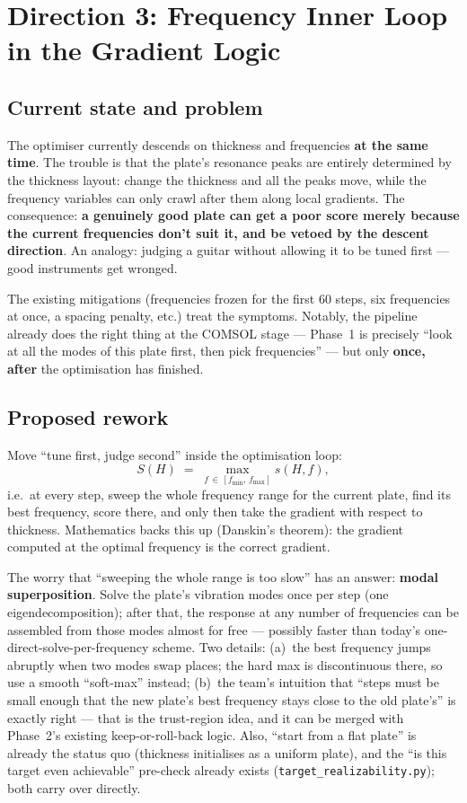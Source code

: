 \documentclass[11pt,a4paper]{article}
\newcommand{\code}[1]{\texttt{#1}}
\begin{document}
\section{Direction 3: Frequency Inner Loop in the Gradient Logic}

\subsection{Current state and problem}

The optimiser currently descends on thickness and frequencies \textbf{at the same time}. The trouble is that the plate's resonance peaks are entirely determined by the thickness layout: change the thickness and all the peaks move, while the frequency variables can only crawl after them along local gradients. The consequence: \textbf{a genuinely good plate can get a poor score merely because the current frequencies don't suit it, and be vetoed by the descent direction}. An analogy: judging a guitar without allowing it to be tuned first --- good instruments get wronged.

The existing mitigations (frequencies frozen for the first 60 steps, six frequencies at once, a spacing penalty, etc.) treat the symptoms. Notably, the pipeline already does the right thing at the COMSOL stage --- Phase~1 is precisely ``look at all the modes of this plate first, then pick frequencies'' --- but only \textbf{once, after} the optimisation has finished.

\subsection{Proposed rework}

Move ``tune first, judge second'' inside the optimisation loop:
\begin{equation}
S(H) \;=\; \max_{f\,\in\,[f_{\min},\,f_{\max}]} s(H, f),
\end{equation}
i.e.\ at every step, sweep the whole frequency range for the current plate, find its best frequency, score there, and only then take the gradient with respect to thickness. Mathematics backs this up (Danskin's theorem): the gradient computed at the optimal frequency is the correct gradient.

The worry that ``sweeping the whole range is too slow'' has an answer: \textbf{modal superposition}. Solve the plate's vibration modes once per step (one eigendecomposition); after that, the response at any number of frequencies can be assembled from those modes almost for free --- possibly faster than today's one-direct-solve-per-frequency scheme. Two details: (a)~the best frequency jumps abruptly when two modes swap places; the hard max is discontinuous there, so use a smooth ``soft-max'' instead; (b)~the team's intuition that ``steps must be small enough that the new plate's best frequency stays close to the old plate's'' is exactly right --- that is the trust-region idea, and it can be merged with Phase~2's existing keep-or-roll-back logic. Also, ``start from a flat plate'' is already the status quo (thickness initialises as a uniform plate), and the ``is this target even achievable'' pre-check already exists (\code{target\_realizability.py}); both carry over directly.
\end{document}
